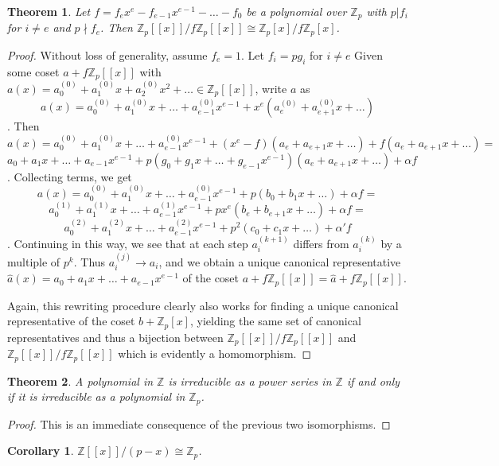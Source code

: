 \documentclass{article}
\newtheorem{theorem}{Theorem}
\newtheorem{corollary}{Corollary}
\begin{document}
\begin{theorem} \label{iso2}
Let $f=f_ex^e - f_{e-1}x^{e-1} - \ldots - f_0$ be a polynomial over $\mathbb{Z}_p$ with $p | f_i$ for $i \ne e$ and $p \nmid f_e$.  Then $\mathbb{Z}_p[[x]]/f\mathbb{Z}_p[[x]] \cong \mathbb{Z}_p[x]/f\mathbb{Z}_p[x]$.
\end{theorem}
\begin{proof}
Without loss of generality, assume $f_e = 1$.  Let $f_i = pg_i$ for $i \ne e$ Given some coset $a + f\mathbb{Z}_p[[x]]$ with $a(x) = a_0^{(0)} + a_1^{(0)}x + a_2^{(0)}x^2 + \ldots \in \mathbb{Z}_p[[x]]$, write $a$ as $$a(x) = a_0^{(0)} + a_1^{(0)}x + \ldots + a_{e-1}^{(0)}x^{e-1} + x^e(a_e^{(0)} + a_{e+1}^{(0)}x + \ldots)$$.  Then $$a(x) = a_0^{(0)} + a_1^{(0)}x + \ldots + a_{e-1}^{(0)}x^{e-1} + (x^e - f)(a_e + a_{e+1}x + \ldots) + f(a_e + a_{e+1}x + \ldots) = $$
$$a_0 + a_1x + \ldots + a_{e-1}x^{e-1} + p(g_0 + g_1x + \ldots + g_{e-1}x^{e-1})(a_e + a_{e+1}x + \ldots) + \alpha f$$.  Collecting terms, we get $$a(x) = a_0^{(0)} + a_1^{(0)}x + \ldots + a_{e-1}^{(0)}x^{e-1} + p(b_0 + b_1x + \ldots) + \alpha f = $$
$$a_0^{(1)} + a_1^{(1)}x + \ldots + a_{e-1}^{(1)}x^{e-1} + px^e(b_e + b_{e+1}x + \dots) + \alpha f =$$
$$a_0^{(2)} + a_1^{(2)}x + \ldots + a_{e-1}^{(2)}x^{e-1} + p^2(c_0 + c_1x + \ldots) + \alpha'f$$.  Continuing in this way, we see that at each step $a_i^{(k+1)}$ differs from $a_i^{(k)}$ by a multiple of $p^k$.  Thus $a_i^{(j)} \to a_i$, and we obtain a unique canonical representative $\hat{a}(x) = a_0 + a_1x + \ldots + a_{e-1}x^{e-1}$ of the coset $a + f\mathbb{Z}_p[[x]] = \hat{a} + f\mathbb{Z}_p[[x]]$.

Again, this rewriting procedure clearly also works for finding a unique canonical representative of the coset $b + \mathbb{Z}_p[x]$, yielding the same set of canonical representatives and thus a bijection between $\mathbb{Z}_p[[x]]/f\mathbb{Z}_p[[x]]$ and $\mathbb{Z}_p[[x]]/f\mathbb{Z}_p[[x]]$ which is evidently a homomorphism.
\end{proof}

\begin{theorem}
A polynomial in $\mathbb{Z}$ is irreducible as a power series in $\mathbb{Z}$ if and only if it is irreducible as a polynomial in $\mathbb{Z}_p$.
\end{theorem}
\begin{proof}
This is an immediate consequence of the previous two isomorphisms.
\end{proof}

\begin{corollary}\label{zp}
$\mathbb{Z}[[x]]/(p-x) \cong \mathbb{Z}_p$.
\end{corollary}
\end{document}
